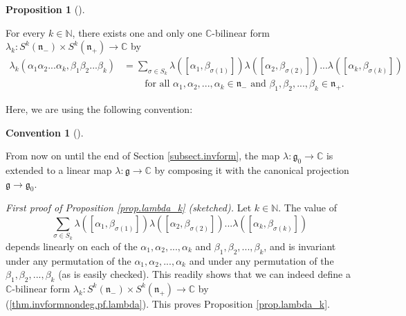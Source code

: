 \documentclass
[numbers=enddot,12pt,final,onecolumn,german,notitlepage]{scrartcl}%
\theoremstyle{definition}
\newtheorem{prop}[theo]{Proposition}
\newenvironment{proposition}[1][]
{\begin{prop}[#1]\begin{leftbar}}
{\end{leftbar}\end{prop}}
\newtheorem{conv}[theo]{Convention}
\newenvironment{Convention}[1][]
{\begin{conv}[#1]\begin{leftbar}}
{\end{leftbar}\end{conv}}
\begin{document}
\begin{proposition}
\label{prop.lambda_k}For every $k\in\mathbb{N}$, there exists one and only one
$\mathbb{C}$-bilinear form $\lambda_{k}:S^{k}\left(  \mathfrak{n}_{-}\right)
\times S^{k}\left(  \mathfrak{n}_{+}\right)  \rightarrow\mathbb{C}$ by
\begin{align}
\lambda_{k}\left(  \alpha_{1}\alpha_{2}...\alpha_{k},\beta_{1}\beta
_{2}...\beta_{k}\right)   &  =\sum\limits_{\sigma\in S_{k}}\lambda\left(
\left[  \alpha_{1},\beta_{\sigma\left(  1\right)  }\right]  \right)
\lambda\left(  \left[  \alpha_{2},\beta_{\sigma\left(  2\right)  }\right]
\right)  ...\lambda\left(  \left[  \alpha_{k},\beta_{\sigma\left(  k\right)
}\right]  \right) \nonumber\\
&  \ \ \ \ \ \ \ \ \ \ \text{for all }\alpha_{1},\alpha_{2},...,\alpha_{k}%
\in\mathfrak{n}_{-}\text{ and }\beta_{1},\beta_{2},...,\beta_{k}%
\in\mathfrak{n}_{+}. \label{thm.invformnondeg.pf.lambda}%
\end{align}

\end{proposition}

Here, we are using the following convention:

\begin{Convention}
From now on until the end of Section \ref{subsect.invform}, the map
$\lambda:\mathfrak{g}_{0}\rightarrow\mathbb{C}$ is extended to a linear map
$\lambda:\mathfrak{g}\rightarrow\mathbb{C}$ by composing it with the canonical
projection $\mathfrak{g}\rightarrow\mathfrak{g}_{0}$.
\end{Convention}

\textit{First proof of Proposition \ref{prop.lambda_k} (sketched).} Let
$k\in\mathbb{N}$. The value of
\[
\sum\limits_{\sigma\in S_{k}}\lambda\left(  \left[  \alpha_{1},\beta
_{\sigma\left(  1\right)  }\right]  \right)  \lambda\left(  \left[  \alpha
_{2},\beta_{\sigma\left(  2\right)  }\right]  \right)  ...\lambda\left(
\left[  \alpha_{k},\beta_{\sigma\left(  k\right)  }\right]  \right)
\]
depends linearly on each of the $\alpha_{1},\alpha_{2},...,\alpha_{k}$ and
$\beta_{1},\beta_{2},...,\beta_{k}$, and is invariant under any permutation of
the $\alpha_{1},\alpha_{2},...,\alpha_{k}$ and under any permutation of the
$\beta_{1},\beta_{2},...,\beta_{k}$ (as is easily checked). This readily shows
that we can indeed define a $\mathbb{C}$-bilinear form $\lambda_{k}%
:S^{k}\left(  \mathfrak{n}_{-}\right)  \times S^{k}\left(  \mathfrak{n}%
_{+}\right)  \rightarrow\mathbb{C}$ by (\ref{thm.invformnondeg.pf.lambda}).
This proves Proposition \ref{prop.lambda_k}.
\end{document}
